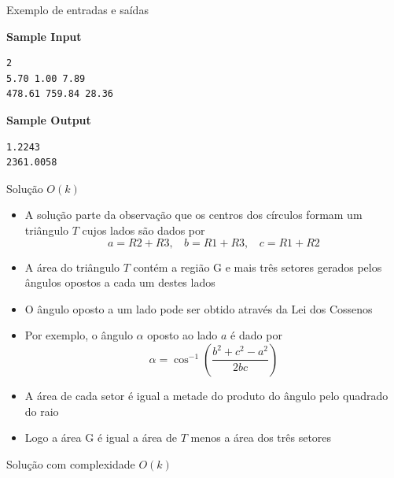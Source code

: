 \begin{frame}[fragile]{Exemplo de entradas e saídas}

\begin{minipage}[t]{0.5\textwidth}
\textbf{Sample Input}
\begin{verbatim}
2
5.70 1.00 7.89
478.61 759.84 28.36
\end{verbatim}
\end{minipage}
\begin{minipage}[t]{0.45\textwidth}
\textbf{Sample Output}
\begin{verbatim}
1.2243
2361.0058
\end{verbatim}
\end{minipage}
\end{frame}

\begin{frame}[fragile]{Solução $O(k)$}

    \begin{itemize}
        \item A solução parte da observação que os centros dos círculos formam um triângulo
            $T$ cujos lados são dados por
        \[
            a = R2 + R3,\ \ \ \ b = R1 + R3,\ \ \ \ c = R1 + R2
        \]
        \pause

        \item A área do triângulo $T$ contém a região G e mais três setores gerados pelos
            ângulos opostos a cada um destes lados
        \pause

        \item O ângulo oposto a um lado pode ser obtido através da Lei dos Cossenos
        \pause

        \item Por exemplo, o ângulo $\alpha$ oposto ao lado $a$ é dado por
        \[
            \alpha = \cos^{-1} \left(\frac{b^2 + c^2 - a^2}{2bc}\right)
        \]
        \pause

        \item A área de cada setor é igual a metade do produto do ângulo pelo quadrado do
            raio
        \pause

        \item Logo a área G é igual a área de $T$ menos a área dos três setores

    \end{itemize}

\end{frame}

\begin{frame}[fragile]{Solução com complexidade $O(k)$}
\end{frame}
